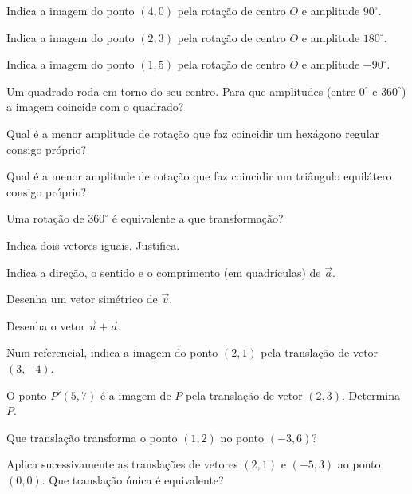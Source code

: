 \documentclass[12pt]{article}
\begin{document}
\begin{exercicios}
  \item Indica a imagem do ponto $(4, 0)$ pela rotação de centro $O$ e amplitude $90^\circ$.
  \item Indica a imagem do ponto $(2, 3)$ pela rotação de centro $O$ e amplitude $180^\circ$.
  \item Indica a imagem do ponto $(1, 5)$ pela rotação de centro $O$ e amplitude $-90^\circ$.
  \item Um quadrado roda em torno do seu centro. Para que amplitudes (entre $0^\circ$ e $360^\circ$) a imagem coincide com o quadrado?
  \item Qual é a menor amplitude de rotação que faz coincidir um hexágono regular consigo próprio?
  \item Qual é a menor amplitude de rotação que faz coincidir um triângulo equilátero consigo próprio?
  \item Uma rotação de $360^\circ$ é equivalente a que transformação?
\end{exercicios}


\begin{center}
\end{center}

\begin{exercicios}
  \item Indica dois vetores iguais. Justifica.
  \item Indica a direção, o sentido e o comprimento (em quadrículas) de $\vec a$.
  \item Desenha um vetor simétrico de $\vec v$.
  \item Desenha o vetor $\vec u + \vec a$.
  \item Num referencial, indica a imagem do ponto $(2, 1)$ pela translação de vetor $(3, -4)$.
  \item O ponto $P'(5, 7)$ é a imagem de $P$ pela translação de vetor $(2, 3)$. Determina $P$.
  \item Que translação transforma o ponto $(1, 2)$ no ponto $(-3, 6)$?
  \item Aplica sucessivamente as translações de vetores $(2, 1)$ e $(-5, 3)$ ao ponto $(0, 0)$. Que translação única é equivalente?
\end{exercicios}
\end{document}
